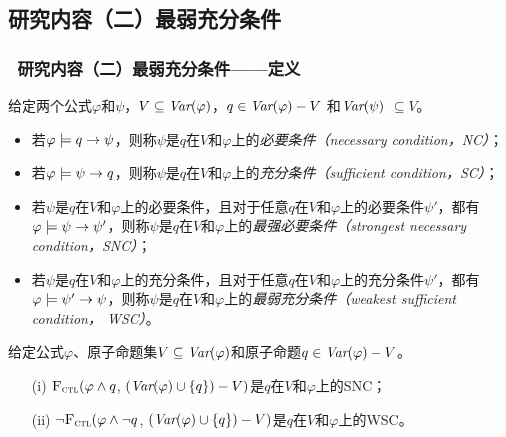 \documentclass[aspectratio=1610, 9pt, CJK]{beamer}
\begin{document}
\subsection{研究内容（二）最弱充分条件}
\begin{frame}
	\frametitle{~研究内容（二）最弱充分条件——{\footnotesize 定义}}
	{\footnotesize
		\begin{definition}[充分和必要条件]\label{def:NC:SC}
			给定两个公式$\varphi$和$\psi$，$V \subseteq \textit{Var}(\varphi)$，$q\in\textit{Var}(\varphi)- V$
			和$\textit{Var}(\psi)$ $\subseteq V$。
			\begin{itemize}
				\item 若$\varphi \models q \rightarrow \psi$，则称$\psi$是$q$在$V$和$\varphi$上的{\em 必要条件（necessary condition，NC）}；
				\item 若$\varphi \models \psi\rightarrow q$，则称$\psi$是$q$在$V$和$\varphi$上的{\em 充分条件（sufficient condition，SC）}；
				\item 若$\psi$是$q$在$V$和$\varphi$上的必要条件，且对于任意$q$在$V$和$\varphi$上的必要条件$\psi'$，都有$\varphi\models\psi\rightarrow\psi'$，则称$\psi$是$q$在$V$和$\varphi$上的{\em 最强必要条件（strongest necessary condition，SNC）}；
				\item 若$\psi$是$q$在$V$和$\varphi$上的充分条件，且对于任意$q$在$V$和$\varphi$上的充分条件$\psi'$，都有$\varphi\models\psi'\rightarrow\psi$，则称$\psi$是$q$在$V$和$\varphi$上的{\em 最弱充分条件（weakest sufficient condition， WSC）}。
			\end{itemize}
		\end{definition}
		\begin{theorem}\label{thm:SNC:WSC:forget}
			给定公式$\varphi$、原子命题集$V\subseteq\textit{Var}(\varphi)$和原子命题$q\in\textit{Var}(\varphi)- V$。
			\begin{itemize}
				\item[(i)] ${\textsc{F}_{\textsc{ctl}}} (\varphi \land q$, $(\textit{Var}(\varphi) \cup \{q\}) - V)$是$q$在$V$和$\varphi$上的SNC；
				\item[(ii)]  $\neg{\textsc{F}_{\textsc{ctl}}} (\varphi \land \neg q$, $(\textit{Var}(\varphi) \cup \{q\}) - V)$是$q$在$V$和$\varphi$上的WSC。
			\end{itemize}
		\end{theorem}
	}
\end{frame}
\end{document}
